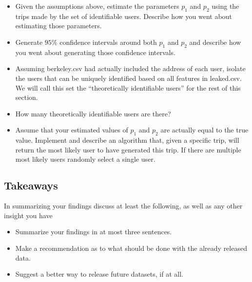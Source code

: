 \documentclass[12pt, answers, addpoints]{exam}
\begin{document}
\begin{itemize}
    \item Given the assumptions above, estimate the parameters $p_1$ and $p_2$ using the trips made by the set of identifiable users. Describe how you went about estimating those parameters.
    \item Generate $95\%$ confidence intervals around both $p_1$ and $p_2$ and describe how you went about generating those confidence intervals.
    \item Assuming berkeley.csv had actually included the address of each user, isolate the users that can be uniquely identified based on all features in leaked.csv. We will call this set the ``theoretically identifiable users'' for the rest of this section.
    \item How many theoretically identifiable users are there?
    \item Assume that your estimated values of $p_1$ and $p_2$ are actually equal to the true value. Implement and describe an algorithm that, given a specific trip, will return the most likely user to have generated this trip. If there are multiple most likely users randomly select a single user.
\end{itemize}

\subsection{Takeaways}
In summarizing your findings discuss at least the following, as well as any other insight you have
\begin{itemize}
    \item Summarize your findings in at most three sentences.
    \item Make a recommendation as to what should be done with the already released data.
    \item Suggest a better way to release future datasets, if at all.
\end{itemize}
\end{document}
